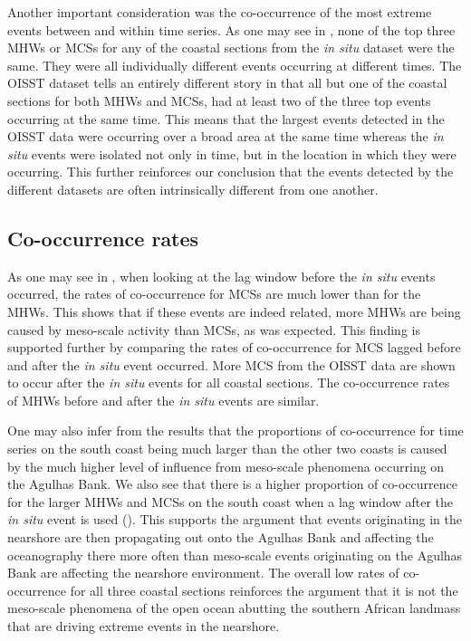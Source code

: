 \documentclass[a4paper,10pt,review]{elsarticle}
\begin{document}
Another important consideration was the co-occurrence of the most extreme events between and within time series. As one may see in , none of the top three MHWs or MCSs for any of the coastal sections from the \emph{in situ} dataset were the same. They were all individually different events occurring at different times. The OISST dataset tells an entirely different story in that all but one of the coastal sections for both MHWs and MCSs, had at least two of the three top events occurring at the same time. This means that the largest events detected in the OISST data were occurring over a broad area at the same time whereas the \emph{in situ} events were isolated not only in time, but in the location in which they were occurring. This further reinforces our conclusion that the events detected by the different datasets are often intrinsically different from one another.

\subsection{Co-occurrence rates}
As one may see in , when looking at the lag window before the \emph{in situ} events occurred, the rates of co-occurrence for MCSs are much lower than for the MHWs. This shows that if these events are indeed related, more MHWs are being caused by meso-scale activity than MCSs, as was expected. This finding is supported further by comparing the rates of co-occurrence for MCS lagged before and after the \emph{in situ} event occurred. More MCS from the OISST data are shown to occur after the \emph{in situ} events for all coastal sections. The co-occurrence rates of MHWs before and after the \emph{in situ} events are similar.

One may also infer from the results that the proportions of co-occurrence for time series on the south coast being much larger than the other two coasts is caused by the much higher level of influence from meso-scale phenomena occurring on the Agulhas Bank. We also see that there is a higher proportion of co-occurrence for the larger MHWs and MCSs on the south coast when a lag window after the \emph{in situ} event is used (). This supports the argument that events originating in the nearshore are then propagating out onto the Agulhas Bank and affecting the oceanography there more often than meso-scale events originating on the Agulhas Bank are affecting the nearshore environment. The overall low rates of co-occurrence for all three coastal sections reinforces the argument that it is not the meso-scale phenomena of the open ocean abutting the southern African landmass that are driving extreme events in the nearshore.
\end{document}
